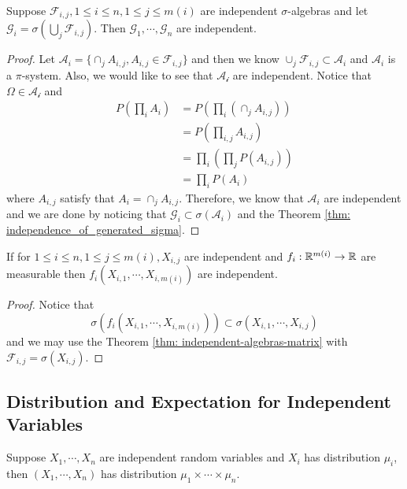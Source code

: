 \begin{theorem}
\label{thm: independent-algebras-matrix}
    Suppose $\mathcal{F}_{i,j} , 1 \leq i \leq n, 1 \leq j \leq m(i)$ are independent $\sigma$-algebras and let $\mathcal{G}_i = \sigma\left(\bigcup_j \mathcal{F}_{i,j}\right)$. Then $\mathcal{G}_1, \cdots , \mathcal{G}_n$ are independent.
\end{theorem}
\begin{proof}
    Let $\mathcal{A}_i = \{\cap_{j} A_{i,j}, A_{i,j}\in\mathcal{F}_{i,j}\}$ and then we know $\cup_j \mathcal{F}_{i,j} \subset \mathcal{A}_i$ and $\mathcal{A}_i$ is a $\pi$-system. Also, we would like to see that $\mathcal{A_i}$ are independent. Notice that $\Omega \in \mathcal{A_i}$ and
    \[
    \begin{aligned}
        P\left(\prod_i A_i\right) &= P\left(\prod_i\left(\cap_{j}A_{i,j}\right)\right) \\
        &= P\left(\prod_{i,j} A_{i,j}\right) \\
        &= \prod_{i}\left(\prod_j P(A_{i,j})\right) \\
        &= \prod_i P(A_i)
    \end{aligned}
    \]
    where $A_{i,j}$ satisfy that $A_i = \cap_j A_{i,j}$. Therefore, we know that $\mathcal{A}_i$ are independent and we are done by noticing that $\mathcal{G}_i \subset \sigma(\mathcal{A}_i)$ and the Theorem \ref{thm: independence_of_generated_sigma}.
\end{proof}

\begin{theorem}
\label{thm: independent-variable-matrix}
    If for $1 \leq i \leq n, 1 \leq j \leq m(i), X_{i,j}$ are independent and $f_i: \mathbb{R}^{m(i)} \to \mathbb{R}$ are measurable then $f_i(X_{i,1}, \cdots , X_{i,m(i)})$ are
independent.
\end{theorem}
\begin{proof}
    Notice that
    \[
    \sigma(f_i(X_{i,1},\cdots,X_{i,m(i)})) \subset \sigma(X_{i,1},\cdots,X_{i,j})
    \]
    and we may use the Theorem \ref{thm: independent-algebras-matrix} with $\mathcal{F}_{i,j} = \sigma(X_{i,j})$.
\end{proof}

\subsection{Distribution and Expectation for Independent Variables}

\begin{lemma}
    Suppose $X_1, \cdots , X_n$ are independent random variables
and $X_i$ has distribution $\mu_i$, then $(X_1, \cdots , X_n)$ has distribution $\mu_1 \times \cdots \times \mu_n$.
\end{lemma}

